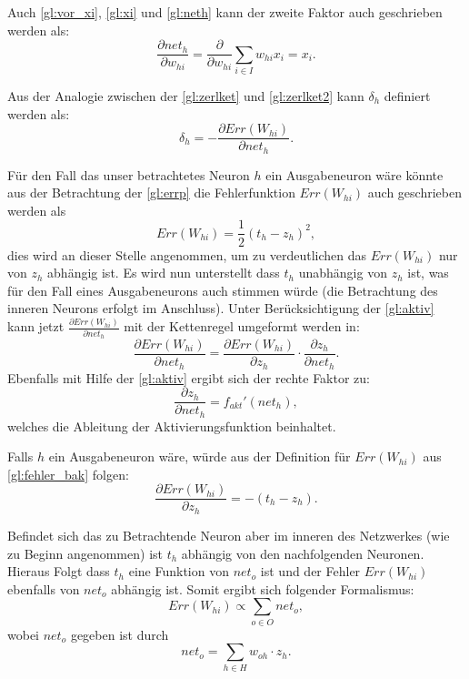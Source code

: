 Auch \autoref{gl:vor_xi}, \autoref{gl:xi} und \autoref{gl:neth} kann der zweite Faktor auch geschrieben werden als:
\begin{equation}
\frac{\partial net_{h}}{\partial w_{hi}} = \frac{\partial }{\partial w_{hi}} \sum\limits_{i \in I} w_{hi} x_{i} = x_{i} .
\label{gl:ok_bak}
\end{equation}

Aus der Analogie zwischen der \autoref{gl:zerlket} und \autoref{gl:zerlket2} kann $\delta_{h}$ definiert werden als:
\begin{equation}
\delta_{h}= -\frac{\partial Err(W_{hi})}{\partial net_{h}}  .
\label{gl:deltah_bak}
\end{equation}

Für den Fall das unser betrachtetes Neuron $h$ ein Ausgabeneuron wäre könnte aus der Betrachtung der \autoref{gl:errp} die Fehlerfunktion $Err(W_{hi})$ auch geschrieben werden als
\begin{equation}
Err(W_{hi})= \frac{1}{2} (t_{h}-z_{h})^2 ,
\label{gl:fehler_bak}
\end{equation}
dies wird an dieser Stelle angenommen, um zu verdeutlichen das $Err(W_{hi})$ nur von $z_{h}$ abhängig ist. Es wird nun unterstellt dass $t_h$ unabhängig von $z_h$ ist, was für den Fall eines Ausgabeneurons auch stimmen würde (die Betrachtung des inneren Neurons erfolgt im Anschluss). Unter Berücksichtigung der \autoref{gl:aktiv} kann jetzt $\frac{\partial Err(W_{hi})}{\partial net_{h}}$ mit der Kettenregel umgeformt werden in:
\begin{equation}
\frac{\partial Err(W_{hi})}{\partial net_{h}} = \frac{\partial Err(W_{hi})}{\partial z_{h}} \cdot \frac{\partial z_{h}}{\partial net_{h}}.
\label{gl:ohket_bak}
\end{equation}
Ebenfalls mit Hilfe der \autoref{gl:aktiv} ergibt sich der rechte Faktor zu:
\begin{equation}
\frac{\partial z_{h}}{\partial net_{h}} = f_{akt}'(net_h),
\label{gl:aktiv_neth_bak}
\end{equation}
welches die Ableitung der Aktivierungsfunktion beinhaltet.

Falls $h$ ein Ausgabeneuron wäre, würde aus der Definition für $Err(W_{hi})$ aus \autoref{gl:fehler_bak} folgen:
\begin{equation}
\frac{\partial Err(W_{hi})}{\partial z_{h}} = -(t_h - z_h).
\end{equation}

Befindet sich das zu Betrachtende Neuron aber im inneren des Netzwerkes (wie zu Beginn angenommen) ist $t_h$ abhängig von den nachfolgenden Neuronen. Hieraus Folgt dass $t_h$ eine Funktion von $net_o$ ist und der Fehler $Err(W_{hi})$ ebenfalls von $net_o$ abhängig ist. Somit ergibt sich folgender Formalismus:
\begin{equation*}
Err(W_{hi}) \propto \sum\limits_{o \in O} net_o,
\end{equation*}
wobei $net_o$ gegeben ist durch
\begin{equation}
net_{o} = \sum_{h \in H} w_{oh} \cdot z_{h} .
\label{gl:netl}
\end{equation}


